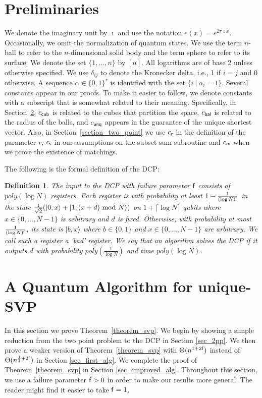 \documentclass[11pt]{article}
\newtheorem{definition}[theorem]{Definition}
\def\balpha{\bar{\alpha}}
\def\mod{{\rm mod}}
\newcommand\ket[1]{{ |{#1} \rangle }}
\newcommand\C[1]{{ c_{\sf {#1}} }}
\begin{document}
\section{Preliminaries}

We denote the imaginary unit by $\imath$ and use the notation $e(x) = e^{2\pi \imath x}$. Occasionally, we omit the
normalization of quantum states. We use the term $n$-ball to refer to the $n$-dimensional solid body and the term
sphere to refer to its surface. We denote the set $\{1,\ldots,n\}$ by $[n]$. All logarithms are of base 2 unless
otherwise specified. We use $\delta_{ij}$ to denote the Kronecker delta, i.e., 1 if $i=j$ and 0 otherwise. A sequence
$\balpha\in \{0,1\}^r$ is identified with the set $\{i~|~\alpha_i=1\}$. Several constants appear in our proofs. To make
it easier to follow, we denote constants with a subscript that is somewhat related to their meaning. Specifically, in
Section~\ref{section_svp}, $\C{cub}$ is related to the cubes that partition the space, $\C{bal}$ is related to the
radius of the balls, and $\C{unq}$ appears in the guarantee of the unique shortest vector. Also, in
Section~\ref{section_two_point} we use $\C{r}$ in the definition of the parameter $r$, $\C{s}$ in our assumptions on
the subset sum subroutine and $\C{m}$ when we prove the existence of matchings.

The following is the formal definition of the DCP:
\begin{definition}
The input to the DCP with failure parameter ${\sf f}$ consists of $poly(\log N)$ registers. Each register is with
probability at least $1-\frac{1}{(\log N)^{\sf f}}$ in the state $\frac{1}{\sqrt{2}}(\ket{0,x}+\ket{1,(x+d)~\mod~N})$
on $1+\lceil \log N \rceil$ qubits where $x\in\{0,\ldots,N-1\}$ is arbitrary and $d$ is fixed. Otherwise, with
probability at most $\frac{1}{(\log N)^{\sf f}}$, its state is $\ket{b,x}$ where $b\in\{0,1\}$ and
$x\in\{0,\ldots,N-1\}$ are arbitrary. We call such a register a `bad' register. We say that an algorithm solves the DCP
if it outputs $d$ with probability $poly(\frac{1}{\log N})$ and time $poly(\log N)$.
\end{definition}

\section{A Quantum Algorithm for unique-SVP}
\label{section_svp}

In this section we prove Theorem~\ref{theorem_svp}. We begin by showing a simple reduction from the two point problem
to the DCP in Section \ref{sec_2pp}. We then prove a weaker version of Theorem~\ref{theorem_svp} with
$\Theta(n^{1+2{\sf f}})$ instead of $\Theta(n^{\frac{1}{2}+2{\sf f}})$ in Section \ref{sec_first_alg}. We complete the
proof of Theorem~\ref{theorem_svp} in Section \ref{sec_improved_alg}. Throughout this section, we use a failure
parameter ${\sf f}>0$ in order to make our results more general. The reader might find it easier to take ${\sf f}=1$.
\end{document}
